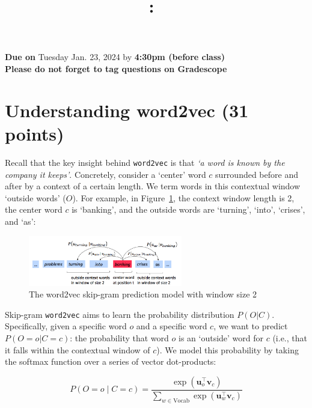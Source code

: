 \documentclass{article}
\title{
\vspace{-1in}
\textmd{\textbf{\hmwkClass:\ \hmwkTitle}}\\
}
\author{}
\date{}
\begin{document}
\maketitle
\vspace{-.7in}

\begin{center}
    \large{\textbf{Due on} Tuesday Jan. 23, 2024 by \textbf{4:30pm (before class)} \\ \textbf{Please do not forget to tag questions on Gradescope}}
\end{center}

\section{Understanding word2vec (31 points)}
Recall that the key insight behind {\tt word2vec} is that \textit{`a word is known by the company it keeps'}. Concretely, consider a `center' word $c$ surrounded before and after by a context of a certain length. We term words in this contextual window `outside words' ($O$). For example, in Figure~\ref{fig:word2vec}, the context window length is 2, the center word $c$ is `banking', and the outside words are `turning', `into', `crises', and `as':

\begin{figure}[h]
    \centering
    \includegraphics[width=0.6\textwidth]{word2vec.png}
    \caption{The word2vec skip-gram prediction model with window size 2}
    \label{fig:word2vec}
\end{figure}

Skip-gram {\tt word2vec} aims to learn the probability distribution $P(O|C)$. 
Specifically, given a specific word $o$ and a specific word $c$, we want to predict $P(O=o|C=c)$: the probability that word $o$ is an `outside' word for $c$ (i.e., that it falls within the contextual window of $c$).
We model this probability by taking the softmax function over a series of vector dot-products: %

\begin{equation}
 P(O=o \mid C=c) = \frac{\exp(\bm u_{o}^\top \bm v_c)}{\sum_{w \in \text{Vocab}} \exp(\bm u_{w}^\top \bm v_c)}
 \label{word2vec_condprob}
\end{equation}
\end{document}
